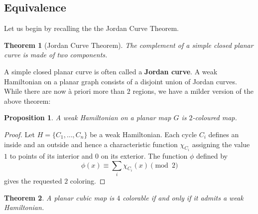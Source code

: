 \documentclass[11pt]{amsart}
\newtheorem{thm}{Theorem}[section]
\newtheorem{prop}{Proposition}[section]
\begin{document}
\subsection{Equivalence}

Let us begin by recalling the the Jordan Curve Theorem.

\begin{thm}[Jordan Curve Theorem]
The complement of a simple closed planar curve is made of two components. 
\end{thm}

A simple closed planar curve is often called a {\bf Jordan curve}.
A weak Hamiltonian on a planar graph consists of a disjoint union of Jordan curves. 
While there are now \`a priori more than $2$ regions, we have a milder version of the above theorem:

\begin{prop}
\label{prop:2color}
A weak Hamiltonian on a planar map $G$ is $2$-coloured map.
\end{prop}

\begin{proof}
Let $H=\{C_{1},\ldots, C_{n}\}$ be a weak Hamiltonian.
Each cycle $C_i$ defines an inside and an outside and hence a characteristic function $\chi_{C_i}$ assigning the value $1$ to points of its interior and $0$ on its exterior.
The function $\phi$ defined by
$$\phi(x) \equiv \sum_i \chi_{C_i} (x) \pmod 2$$
gives the requested $2$ coloring.
\end{proof}

\begin{thm}
\label{thm:main}
A planar cubic map is $4$ colorable if and only if it admits a weak Hamiltonian.
\end{thm}
\end{document}
